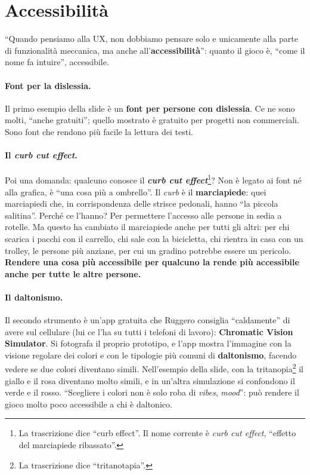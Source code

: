 \section{Accessibilità}
\label{a10:sec:accessibilita}



``Quando pensiamo alla UX, non dobbiamo pensare solo e unicamente alla parte di
funzionalità meccanica, ma anche all'\textbf{accessibilità}'': quanto il gioco è,
``come il nome fa intuire'', accessibile.

\paragraph{Font per la dislessia.} Il primo esempio della slide è un \textbf{font per
persone con dislessia}. Ce ne sono molti, ``anche gratuiti''; quello mostrato è
gratuito per progetti non commerciali. Sono font che rendono più facile la lettura dei
testi.

\paragraph{Il \emph{curb cut effect}.} Poi una domanda: qualcuno conosce il
\textbf{\emph{curb cut effect}}\footnote{La trascrizione dice ``curb effect''. Il nome
corrente è \emph{curb cut effect}, ``effetto del marciapiede ribassato''.}? Non è legato
ai font né alla grafica, è ``una cosa più a ombrello''. Il \emph{curb} è il
\textbf{marciapiede}: quei marciapiedi che, in corrispondenza delle strisce pedonali,
hanno ``la piccola salitina''. Perché ce l'hanno? Per permettere l'accesso alle persone
in sedia a rotelle. Ma questo ha cambiato il marciapiede anche per tutti gli altri: per
chi scarica i pacchi con il carrello, chi sale con la bicicletta, chi rientra in casa
con un trolley, le persone più anziane, per cui un gradino potrebbe essere un pericolo.
\textbf{Rendere una cosa più accessibile per qualcuno la rende più accessibile anche
per tutte le altre persone.}

\paragraph{Il daltonismo.} Il secondo strumento è un'app gratuita che Ruggero consiglia
``caldamente'' di avere sul cellulare (lui ce l'ha su tutti i telefoni di lavoro):
\textbf{Chromatic Vision Simulator}. Si fotografa il proprio prototipo, e l'app mostra
l'immagine con la visione regolare dei colori e con le tipologie più comuni di
\textbf{daltonismo}, facendo vedere se due colori diventano simili. Nell'esempio della
slide, con la tritanopia\footnote{La trascrizione dice ``tritanotapia''.} il giallo e il
rosa diventano molto simili, e in un'altra simulazione si confondono il verde e il
rosso. ``Scegliere i colori non è solo roba di \emph{vibes}, \emph{mood}'': può rendere
il gioco molto poco accessibile a chi è daltonico.

